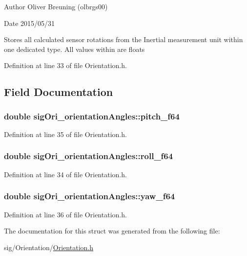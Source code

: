  \begin{DoxyAuthor}{Author}
Oliver Breuning (olbrgs00) 
\end{DoxyAuthor}
\begin{DoxyDate}{Date}
2015/05/31
\end{DoxyDate}
Stores all calculated sensor rotations from the Inertial measurement unit within one dedicated type. All values within are floats

Definition at line 33 of file Orientation.\+h.



\subsection{Field Documentation}
\hypertarget{structsigOri__orientationAngles_a36aa8568f26ce93d16385822cf2e76de_a36aa8568f26ce93d16385822cf2e76de}{
\subsubsection[{pitch\+\_\+f64}]{\setlength{\rightskip}{0pt plus 5cm}double sig\+Ori\+\_\+orientation\+Angles\+::pitch\+\_\+f64}}\label{structsigOri__orientationAngles_a36aa8568f26ce93d16385822cf2e76de_a36aa8568f26ce93d16385822cf2e76de}


Definition at line 35 of file Orientation.\+h.

\hypertarget{structsigOri__orientationAngles_a0bdf621a53623bc73765e918e368c76e_a0bdf621a53623bc73765e918e368c76e}{
\subsubsection[{roll\+\_\+f64}]{\setlength{\rightskip}{0pt plus 5cm}double sig\+Ori\+\_\+orientation\+Angles\+::roll\+\_\+f64}}\label{structsigOri__orientationAngles_a0bdf621a53623bc73765e918e368c76e_a0bdf621a53623bc73765e918e368c76e}


Definition at line 34 of file Orientation.\+h.

\hypertarget{structsigOri__orientationAngles_a4d2dd55644a4f5484f1809f64f14e792_a4d2dd55644a4f5484f1809f64f14e792}{
\subsubsection[{yaw\+\_\+f64}]{\setlength{\rightskip}{0pt plus 5cm}double sig\+Ori\+\_\+orientation\+Angles\+::yaw\+\_\+f64}}\label{structsigOri__orientationAngles_a4d2dd55644a4f5484f1809f64f14e792_a4d2dd55644a4f5484f1809f64f14e792}


Definition at line 36 of file Orientation.\+h.



The documentation for this struct was generated from the following file\+:\begin{DoxyCompactItemize}
\item 
sig/\+Orientation/\hyperlink{Orientation_8h}{Orientation.\+h}\end{DoxyCompactItemize}
